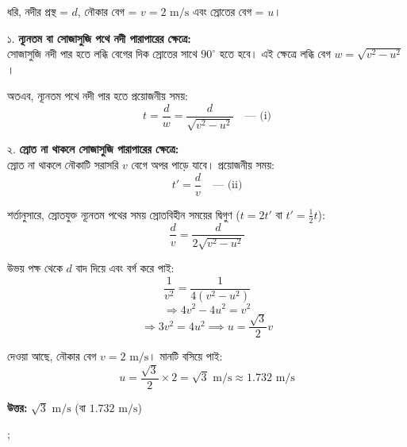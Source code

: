 \documentclass[11pt,a4paper]{article}
\begin{document}
\begin{solbox}
\begin{center}
\end{center}

ধরি, নদীর প্রস্থ = $d$, নৌকার বেগ = $v = 2\text{ m/s}$ এবং স্রোতের বেগ = $u$।

১. \textbf{ন্যূনতম বা সোজাসুজি পথে নদী পারাপারের ক্ষেত্রে:} \\
সোজাসুজি নদী পার হতে লব্ধি বেগের দিক স্রোতের সাথে $90^\circ$ হতে হবে। এই ক্ষেত্রে লব্ধি বেগ $w = \sqrt{v^2 - u^2}$।

অতএব, ন্যূনতম পথে নদী পার হতে প্রয়োজনীয় সময়:
$$t = \frac{d}{w} = \frac{d}{\sqrt{v^2 - u^2}} \quad \text{--- (i)}$$

২. \textbf{স্রোত না থাকলে সোজাসুজি পারাপারের ক্ষেত্রে:} \\
স্রোত না থাকলে নৌকাটি সরাসরি $v$ বেগে অপর পাড়ে যাবে। প্রয়োজনীয় সময়:
$$t' = \frac{d}{v} \quad \text{--- (ii)}$$

শর্তানুসারে, স্রোতযুক্ত ন্যূনতম পথের সময় স্রোতবিহীন সময়ের দ্বিগুণ ($t = 2t'$ বা $t' = \frac{1}{2}t$):
$$\frac{d}{v} = \frac{d}{2\sqrt{v^2 - u^2}}$$

উভয় পক্ষ থেকে $d$ বাদ দিয়ে এবং বর্গ করে পাই:
$$\frac{1}{v^2} = \frac{1}{4(v^2 - u^2)}$$
$$\Rightarrow 4v^2 - 4u^2 = v^2$$
$$\Rightarrow 3v^2 = 4u^2 \implies u = \frac{\sqrt{3}}{2}v$$

দেওয়া আছে, নৌকার বেগ $v = 2\text{ m/s}$। মানটি বসিয়ে পাই:
$$u = \frac{\sqrt{3}}{2} \times 2 = \sqrt{3}\text{ m/s} \approx 1.732\text{ m/s}$$

\textbf{উত্তর:} $\sqrt{3}\text{ m/s}$ (বা $1.732\text{ m/s}$)
\end{solbox};
\end{document}

